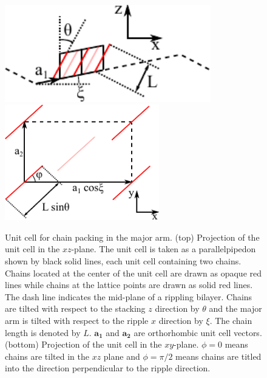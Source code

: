 \documentclass[12pt]{article}
\begin{document}
\begin{figure}
  \centering
  \includegraphics[width=0.8\textwidth]{unit_cell_waxs_side} \\
  \includegraphics[width=0.6\textwidth]{unit_cell_waxs_top}
  \caption[Unit cell for chain packing in the major arm]
  {Unit cell for chain packing in the major arm. 
  (top) Projection of the unit cell in the $xz$-plane. The unit cell is taken
  as a parallelpipedon shown by black solid lines, each unit cell 
  containing two chains.
  Chains located at the center of the unit cell are
  drawn as opaque red lines while chains at the lattice points are 
  drawn as solid red lines. The dash line indicates
  the mid-plane of a rippling bilayer. Chains are tilted with respect to
  the stacking $z$ direction by $\theta$ and the major arm is tilted 
  with respect to the ripple $x$ direction by $\xi$. The chain length
  is denoted by $L$. $\mathbf{a_1}$ and $\mathbf{a_2}$ are orthorhombic 
  unit cell vectors.
  (bottom) Projection of the unit cell in the $xy$-plane.
  $\phi=0$ means chains are tilted in the $xz$ plane and $\phi=\pi/2$
  means chains are titled into the direction perpendicular to the 
  ripple direction.}
  \label{fig:unit_cell_waxs}
\end{figure}
\end{document}
